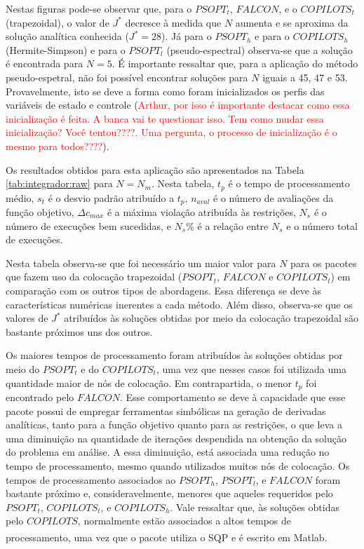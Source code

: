 Nestas figuras pode-se observar que, para o $ PSOPT_t $, $ FALCON $, e o $ COPILOTS_t $ (trapezoidal), o valor de $ J^* $ decresce à medida que $ N $ aumenta e se aproxima da solução analítica conhecida ($ J^* = 28 $). Já para o $ PSOPT_h $ e para o $ COPILOTS_h $ (Hermite-Simpson) e para o $ PSOPT_l $ (pseudo-espectral) observa-se que a solução é encontrada para $ N = 5 $. É importante ressaltar que, para a aplicação do método pseudo-espetral, não foi possível encontrar soluções para $ N $ iguais a 45, 47 e 53. Provavelmente, isto se deve a forma como foram inicializados os perfis das variáveis de estado e controle (\textcolor{red}{Arthur, por isso é importante destacar como essa inicialização é feita. A banca vai te questionar isso. Tem como mudar essa inicialização? Você tentou????. Uma pergunta, o processo de inicialização é o mesmo para todos????}).

Os resultados obtidos para esta aplicação são apresentados na Tabela \ref{tab:integrador:raw} para $ N = N_m$. Nesta tabela, $ t_p $ é o tempo de processamento médio, $ s_t $ é o desvio padrão atribuído a $ t_p $, $ n_{aval} $ é o número de avaliações da função objetivo, $ \Delta c_{max} $ é a máxima violação atribuída às restrições, $ N_s $ é o número de execuções bem sucedidas, e $ N_s\% $ é a relação entre $ N_s $ e o número total de execuções. 



Nesta tabela observa-se que foi necessário um maior valor para $ N $ para os pacotes que fazem uso da colocação trapezoidal ($ PSOPT_t $, $ FALCON $ e $ COPILOTS_t $) em comparação com os outros tipos de abordagens. Essa diferença se deve às características numéricas inerentes a cada método. Além disso, observa-se que os valores de $ J^* $ atribuídos às soluções obtidas por meio da colocação trapezoidal são bastante próximos uns dos outros.

Os maiores tempos de processamento foram atribuídos às soluções obtidas por meio do $ PSOPT_t $ e do $ COPILOTS_t $, uma vez que nesses casos foi utilizada uma quantidade maior de nós de colocação. Em contrapartida, o menor $ t_p $ foi encontrado pelo $ FALCON $. Esse comportamento se deve à capacidade que esse pacote possui de empregar ferramentas simbólicas na geração de derivadas analíticas, tanto para a função objetivo quanto para as restrições, o que leva a uma diminuição na quantidade de iterações despendida na obtenção da solução do problema em análise. A essa diminuição, está associada uma redução no tempo de processamento, mesmo quando utilizados muitos nós de colocação. Os tempos de processamento associados ao $ PSOPT_h $, $ PSOPT_l $, e $ FALCON $ foram bastante próximo e, consideravelmente, menores que aqueles requeridos pelo $ PSOPT_t $, $ COPILOTS_t $, e $ COPILOTS_h $. Vale ressaltar que, às soluções obtidas pelo $ COPILOTS $, normalmente estão associados a altos tempos de processamento, uma vez que o pacote utiliza o SQP e é escrito em Matlab\textsuperscript{\textregistered}.


